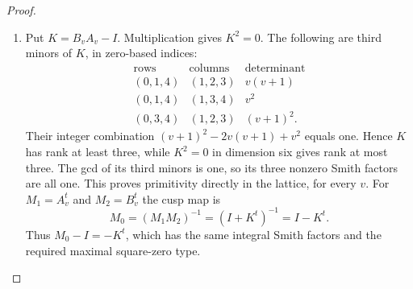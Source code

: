 \begin{proof}
\begin{enumerate}[label={$\langle1\rangle$\arabic*.}]
The exact unit needed in the hatted lattice is
\[
 z=(-v^3+v-1,0,0,2,2(1-v^2))^t.
\]
Writing $a=-v^3+v-1$, the first coordinate of $Y'z$ is
$-2a-2+2v(1-v^2)=0$. Half its second coordinate is
$(1-v)a+(v^2-v)+q(1-v^2)=0$, since the first two terms
sum to $v^4-v^3+v-1$ and the last is its negative. Furthermore
\[
 \beta z=s(v^3-v-1)+2v^2r=1.
 \tag{F.U5}\hypertarget{tag-02IR}{}\label{maps:eq:F.U5}
\]
Indeed the two summands expand to
$v^5+v^4-2v^3-2v^2+1$ and
$-v^5-v^4+2v^3+2v^2$.
Since $AB=I-N$ and $NPz=X(Y'z)=0$, the six-dimensional
map satisfies
\[
 (\widehat A\widehat B-I)(0,z)^t=e_0.
\]
This establishes the unit in the displayed hatted coordinates.

The row identity
$\beta(I+B'+B'^2+B'^3)=0$ proves
$\widehat B^4=I$; also $\widehat A^5=I$. Their quotient actions
show that these orders are exact.

Use the lattice change
\[
 L=\frac14\begin{pmatrix}
 -2&3&-5&-1&5&-3\\
 0&2&-2&2&-2&2\\
 0&-4&0&0&4&-4\\
 0&0&0&-4&4&-4\\
 0&0&4&-4&4&-4\\
 0&0&0&-4&4&0
 \end{pmatrix},\qquad
 A_v=L^{-1}\widehat A L,\quad B_v=L^{-1}\widehat B L.
 \tag{F.U6}\hypertarget{tag-02IS}{}\label{maps:eq:F.U6}
\]
Here $\det L=-1/4$. Expanding these products gives entries in
$\mathbb Z[v]$ for both matrices. The complete expanded entries
and the exact identities
$LA_v=\widehat A L$, $LB_v=\widehat B L$ are given by the
polynomial certificate described in the last item. Thus the
defined matrices act on the stated $\mathbb Z^6$ for every integer
parameter. Their determinants are one and their inverses are
the integer powers $A_v^4,B_v^3$. Their characteristic polynomials are
\[
 (x-1)^2\Phi_5(x),\qquad (x-1)^2(x+1)^2(x^2+1),
\]
respectively.

\item Put $K=B_vA_v-I$. Multiplication gives $K^2=0$.
The following are third minors of $K$, in zero-based indices:
\[
 \begin{array}{c|c|c}
 \text{rows}&\text{columns}&\text{determinant}\\\hline
 (0,1,4)&(1,2,3)&v(v+1)\\
 (0,1,4)&(1,3,4)&v^2\\
 (0,3,4)&(1,2,3)&(v+1)^2.
 \end{array}
\]
Their integer combination $(v+1)^2-2v(v+1)+v^2$ equals one.
Hence $K$ has rank at least three, while $K^2=0$ in dimension six
gives rank at most three. The gcd of its third minors is one,
so its three nonzero Smith factors are all one. This proves
primitivity directly in the lattice, for every $v$.
For $M_1=A_v^t$ and $M_2=B_v^t$ the cusp map is
\[
 M_0=(M_1M_2)^{-1}=(I+K^t)^{-1}=I-K^t.
\]
Thus $M_0-I=-K^t$, which has the same integral Smith factors
and the required maximal square-zero type.


\end{enumerate}
\end{proof}
